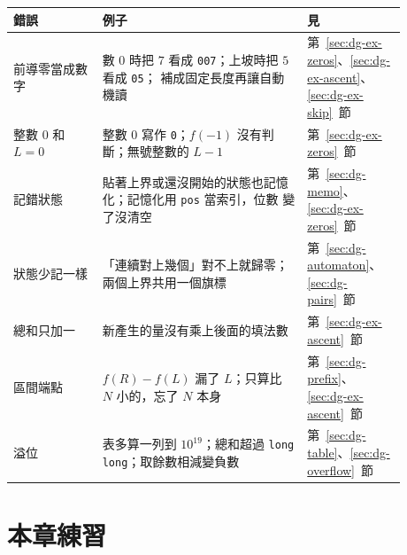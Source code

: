 \begin{center}
\begin{tabular}{p{0.2\linewidth}p{0.46\linewidth}p{0.22\linewidth}}
\toprule
錯誤 & 例子 & 見 \\
\midrule
前導零當成數字 & 數 $0$ 時把 $7$ 看成 \texttt{007}；上坡時把 $5$ 看成 \texttt{05}；
補成固定長度再讓自動機讀 &
第~\ref{sec:dg-ex-zeros}、\ref{sec:dg-ex-ascent}、\ref{sec:dg-ex-skip}~節 \\
整數 $0$ 和 $L = 0$ & 整數 $0$ 寫作 \texttt{0}；$f(-1)$ 沒有判斷；無號整數的
$L - 1$ & 第~\ref{sec:dg-ex-zeros}~節 \\
記錯狀態 & 貼著上界或還沒開始的狀態也記憶化；記憶化用 \texttt{pos} 當索引，位數
變了沒清空 & 第~\ref{sec:dg-memo}、\ref{sec:dg-ex-zeros}~節 \\
狀態少記一樣 & 「連續對上幾個」對不上就歸零；兩個上界共用一個旗標 &
第~\ref{sec:dg-automaton}、\ref{sec:dg-pairs}~節 \\
總和只加一 & 新產生的量沒有乘上後面的填法數 & 第~\ref{sec:dg-ex-ascent}~節 \\
區間端點 & $f(R) - f(L)$ 漏了 $L$；只算比 $N$ 小的，忘了 $N$ 本身 &
第~\ref{sec:dg-prefix}、\ref{sec:dg-ex-ascent}~節 \\
溢位 & 表多算一列到 $10^{19}$；總和超過 \texttt{long long}；取餘數相減變負數 &
第~\ref{sec:dg-table}、\ref{sec:dg-overflow}~節 \\
\bottomrule
\end{tabular}
\end{center}

\section{本章練習}
\label{sec:dg-exercises}


